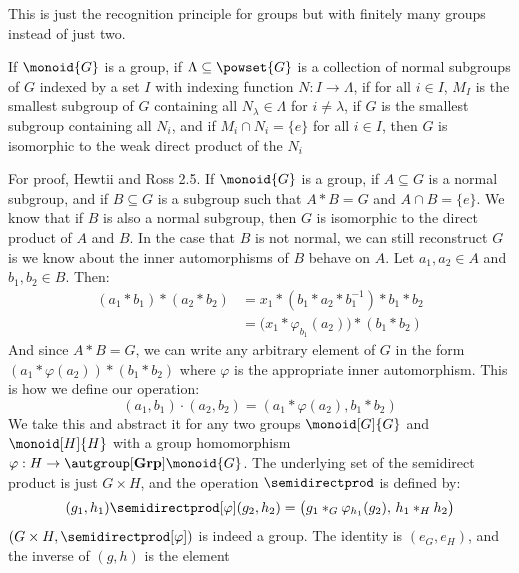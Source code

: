 This is just the recognition principle for groups but with finitely many groups
instead of just two.
\begin{theorem}
    If $\monoid{G}$ is a group, if $\Lambda\subseteq\powset{G}$ is a collection
    of normal subgroups of $G$ indexed by a set $I$ with indexing function
    $N:I\rightarrow\Lambda$, if for all $i\in{I}$, $M_{I}$ is the smallest
    subgroup of $G$ containing all $N_{\lambda}\in\Lambda$ for $i\ne\lambda$, if
    $G$ is the smallest subgroup containing all $N_{i}$, and if
    $M_{i}\cap{N}_{i}=\{e\}$ for all $i\in{I}$, then $G$ is isomorphic to the
    weak direct product of the $N_{i}$
\end{theorem}
For proof, Hewtii and Ross 2.5. If $\monoid{G}$ is a group, if $A\subseteq{G}$
is a normal subgroup, and if $B\subseteq{G}$ is a subgroup such that
$A*B=G$ and $A\cap{B}=\{e\}$. We know that if $B$ is also a normal subgroup,
then $G$ is isomorphic to the direct product of $A$ and $B$. In the case that
$B$ is not normal, we can still reconstruct $G$ is we know about the inner
automorphisms of $B$ behave on $A$. Let $a_{1},a_{2}\in{A}$ and
$b_{1},b_{2}\in{B}$. Then:
\begin{subequations}
    \begin{align}
        (a_{1}*b_{1})*(a_{2}*b_{2})
        &=x_{1}*(b_{1}*a_{2}*b_{1}^{\minus{1}})*b_{1}*b_{2}\\
        &=\big(x_{1}*\varphi_{b_{1}}(a_{2})\big)*(b_{1}*b_{2})
    \end{align}
\end{subequations}
And since $A*B=G$, we can write any arbitrary element of $G$ in the form
$(a_{1}*\varphi(a_{2}))*(b_{1}*b_{2})$ where $\varphi$ is the appropriate
inner automorphism. This is how we define our operation:
\begin{equation}
    (a_{1},b_{1})\cdot(a_{2},b_{2})
    =(a_{1}*\varphi(a_{2}),b_{1}*b_{2})
\end{equation}
We take this and abstract it for any two groups $\monoid[G]{G}$ and
$\monoid[H]{H}$ with a group homomorphism
$\varphi:H\rightarrow\autgroup[\textbf{Grp}]{\monoid{G}}$. The underlying set of
the semidirect product is just $G\times{H}$, and the operation $\semidirectprod$
is defined by:
\begin{equation}
    (g_{1},h_{1})\semidirectprod[\varphi](g_{2},h_{2})=
    \big(g_{1}*_{G}\varphi_{h_{1}}(g_{2}),\,h_{1}*_{H}h_{2}\big)
\end{equation}
$(G\times{H},\semidirectprod[\varphi])$ is indeed a group. The identity is
$(e_{G},e_{H})$, and the inverse of $(g,h)$ is the element
